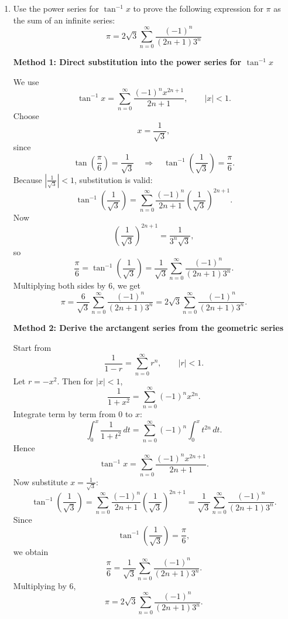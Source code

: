 \documentclass[a4paper,12pt,twocolumn]{article}
\newenvironment{solutionbox}{\begin{framed}}{\end{framed}}
\begin{document}
\begin{enumerate}[label=\textbf{\arabic*.}, leftmargin=2em, itemsep=1.2em]
\begin{solutionbox}
\textbf{(c)} Write
\[
J_0(x)=\sum_{n=0}^{\infty}b_nx^{2n},
\qquad
b_n=\frac{(-1)^n}{(n!)^2 2^{2n}}.
\]
Then
\[
J_0'(x)=\sum_{n=0}^{\infty}2(n+1)b_{n+1}x^{2n+1}.
\]
Now
\[
2(n+1)b_{n+1}
=
2(n+1)\cdot \frac{(-1)^{n+1}}{((n+1)!)^2 2^{2n+2}}
=
\frac{(-1)^{n+1}}{n!(n+1)!2^{2n+1}}
=
-a_n.
\]
Therefore
\[
J_0'(x)=\sum_{n=0}^{\infty}(-a_n)x^{2n+1}=-J_1(x).
\]

\medskip
\textbf{Answer:}
\[
\boxed{\text{Domain of }J_1=(-\infty,\infty),\quad
x^2J_1''+xJ_1'+(x^2-1)J_1=0,\quad
J_0'(x)=-J_1(x).}
\]
\end{solutionbox}

\setcounter{enumi}{48}
\item Use the power series for \(\tan^{-1}x\) to prove the following expression for \(\pi\) as the sum of an infinite series:
\[
\pi = 2\sqrt{3}\sum_{n=0}^{\infty}\frac{(-1)^n}{(2n+1)3^n}
\]

\begin{solutionbox}
\textbf{Method 1: Direct substitution into the power series for \(\tan^{-1}x\)}

We use
\[
\tan^{-1}x=\sum_{n=0}^{\infty}\frac{(-1)^n x^{2n+1}}{2n+1},
\qquad |x|<1.
\]
Choose
\[
x=\frac{1}{\sqrt{3}},
\]
since
\[
\tan\left(\frac{\pi}{6}\right)=\frac{1}{\sqrt{3}}
\quad\Longrightarrow\quad
\tan^{-1}\left(\frac{1}{\sqrt{3}}\right)=\frac{\pi}{6}.
\]
Because \(\left|\frac{1}{\sqrt{3}}\right|<1\), substitution is valid:
\[
\tan^{-1}\left(\frac{1}{\sqrt{3}}\right)
=
\sum_{n=0}^{\infty}\frac{(-1)^n}{2n+1}\left(\frac{1}{\sqrt{3}}\right)^{2n+1}.
\]
Now
\[
\left(\frac{1}{\sqrt{3}}\right)^{2n+1}
=
\frac{1}{3^n\sqrt{3}},
\]
so
\[
\frac{\pi}{6}
=
\tan^{-1}\left(\frac{1}{\sqrt{3}}\right)
=
\frac{1}{\sqrt{3}}\sum_{n=0}^{\infty}\frac{(-1)^n}{(2n+1)3^n}.
\]
Multiplying both sides by \(6\), we get
\[
\pi
=
\frac{6}{\sqrt{3}}\sum_{n=0}^{\infty}\frac{(-1)^n}{(2n+1)3^n}
=
2\sqrt{3}\sum_{n=0}^{\infty}\frac{(-1)^n}{(2n+1)3^n}.
\]
\end{solutionbox}

\begin{solutionbox}
\textbf{Method 2: Derive the arctangent series from the geometric series}

Start from
\[
\frac{1}{1-r}=\sum_{n=0}^{\infty}r^n,
\qquad |r|<1.
\]
Let \(r=-x^2\). Then for \(|x|<1\),
\[
\frac{1}{1+x^2}
=
\sum_{n=0}^{\infty}(-1)^n x^{2n}.
\]
Integrate term by term from \(0\) to \(x\):
\[
\int_0^x \frac{1}{1+t^2}\,dt
=
\sum_{n=0}^{\infty}(-1)^n\int_0^x t^{2n}\,dt.
\]
Hence
\[
\tan^{-1}x
=
\sum_{n=0}^{\infty}\frac{(-1)^n x^{2n+1}}{2n+1}.
\]
Now substitute \(x=\frac{1}{\sqrt{3}}\):
\[
\tan^{-1}\left(\frac{1}{\sqrt{3}}\right)
=
\sum_{n=0}^{\infty}\frac{(-1)^n}{2n+1}\left(\frac{1}{\sqrt{3}}\right)^{2n+1}
=
\frac{1}{\sqrt{3}}\sum_{n=0}^{\infty}\frac{(-1)^n}{(2n+1)3^n}.
\]
Since
\[
\tan^{-1}\left(\frac{1}{\sqrt{3}}\right)=\frac{\pi}{6},
\]
we obtain
\[
\frac{\pi}{6}
=
\frac{1}{\sqrt{3}}\sum_{n=0}^{\infty}\frac{(-1)^n}{(2n+1)3^n}.
\]
Multiplying by \(6\),
\[
\pi
=
2\sqrt{3}\sum_{n=0}^{\infty}\frac{(-1)^n}{(2n+1)3^n}.
\]


\end{solutionbox}
\end{enumerate}
\end{document}
